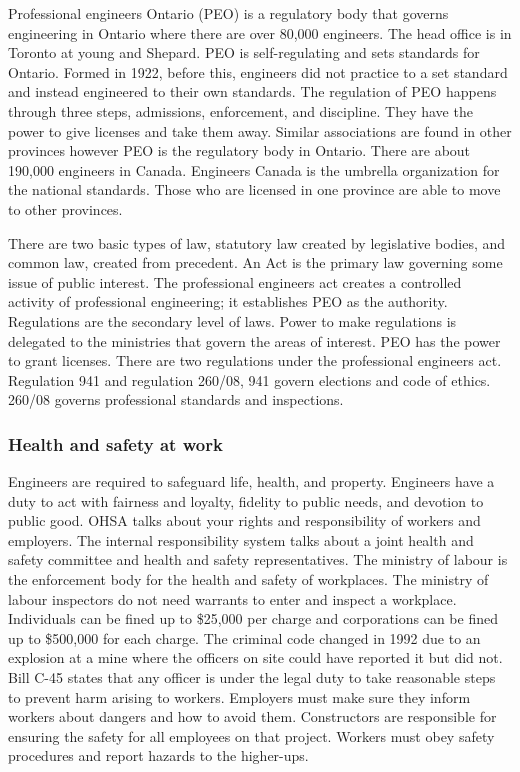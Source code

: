 \documentclass[12pt,a4paper]{report}
\begin{document}
    Professional engineers Ontario (PEO) is a regulatory body that governs engineering in Ontario where there are over 80,000 engineers. The head office is in Toronto at young and Shepard. PEO is self-regulating and sets standards for Ontario. Formed in 1922, before this, engineers did not practice to a set standard and instead engineered to their own standards. The regulation of PEO happens through three steps, admissions, enforcement, and discipline. They have the power to give licenses and take them away. Similar associations are found in other provinces however PEO is the regulatory body in Ontario. There are about 190,000 engineers in Canada. Engineers Canada is the umbrella organization for the national standards. Those who are licensed in one province are able to move to other provinces. 
    \par
    There are two basic types of law, statutory law created by legislative bodies, and common law, created from precedent. An Act is the primary law governing some issue of public interest. The professional engineers act creates a controlled activity of professional engineering; it establishes PEO as the authority. Regulations are the secondary level of laws. Power to make regulations is delegated to the ministries that govern the areas of interest. PEO has the power to grant licenses. There are two regulations under the professional engineers act. Regulation 941 and regulation 260/08, 941 govern elections and code of ethics.  260/08 governs professional standards and inspections.
 
    
    \subsubsection{Health and safety at work}
    
    Engineers are required to safeguard life, health, and property. Engineers have a duty to act with fairness and loyalty, fidelity to public needs, and devotion to public good. OHSA talks about your rights and responsibility of workers and employers. The internal responsibility system talks about a joint health and safety committee and health and safety representatives. The ministry of labour is the enforcement body for the health and safety of workplaces. The ministry of labour inspectors do not need warrants to enter and inspect a workplace. Individuals can be fined up to \$25,000 per charge and corporations can be fined up to \$500,000 for each charge. The criminal code changed in 1992 due to an explosion at a mine where the officers on site could have reported it but did not.  Bill C-45 states that any officer is under the legal duty to take reasonable steps to prevent harm arising to workers. Employers must make sure they inform workers about dangers and how to avoid them. Constructors are responsible for ensuring the safety for all employees on that project. Workers must obey safety procedures and report hazards to the higher-ups. \par
    
\end{document}
